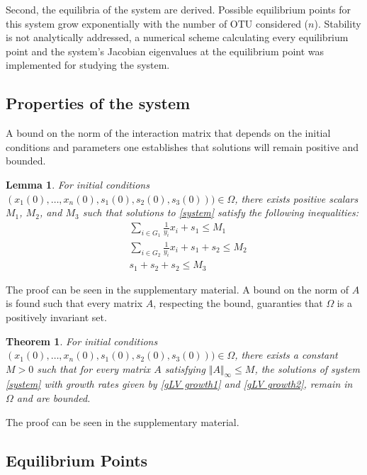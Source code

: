 \documentclass[3p,times]{article}
\newtheorem{lemma}{Lemma}
\newtheorem{theo}{Theorem}
\begin{document}
Second, the equilibria of the system are derived. Possible equilibrium points for this system grow exponentially with the number of OTU considered ($n$).  Stability is not analytically addressed, a numerical scheme calculating every equilibrium point and the system's Jacobian eigenvalues at the equilibrium point was implemented for studying the system. 


\subsection{Properties of the system}

A bound on the norm of the interaction matrix that depends on the initial conditions and parameters one establishes that solutions will remain positive and bounded. 

\begin{lemma}
	\label{l1}
	For initial conditions $(x_1(0),\dots,x_n(0),s_1(0),s_2(0),s_3(0)))\in \Omega$, there exists positive scalars $M_1$, $M_2$, and $M_3$ such that solutions to \eqref{system} satisfy the following inequalities:
	\begin{align}
	&\sum \limits_{i \in G_1} \frac{1}{y_i}x_i + s_1 \leq M_1 \\
	&\sum \limits_{i \in G_2} \frac{1}{y_i}x_i + s_1 +s_2 \leq M_2 \\
	&s_1 + s_2 + s_2 \leq M_3
	\end{align}
\end{lemma}

The proof can be seen in the supplementary material. A bound on the norm of $A$ is found such that every matrix $A$, respecting the bound, guaranties that $\Omega$ is a positively invariant set.

\begin{theo}
	\label{theoWellPosedness}
	For initial conditions $(x_1(0),\dots,x_n(0),s_1(0),s_2(0),s_3(0)))\in \Omega$, there exists a constant $M>0$ such that for every matrix $A$ satisfying $\Vert A \Vert_{\infty} \leq M $, the solutions of system \eqref{system} with growth rates given by \eqref{gLV growth1} and \eqref{gLV growth2}, remain in $\Omega$ and are bounded.
\end{theo}

The proof can be seen in the supplementary material.

\subsection{Equilibrium Points}
\end{document}
